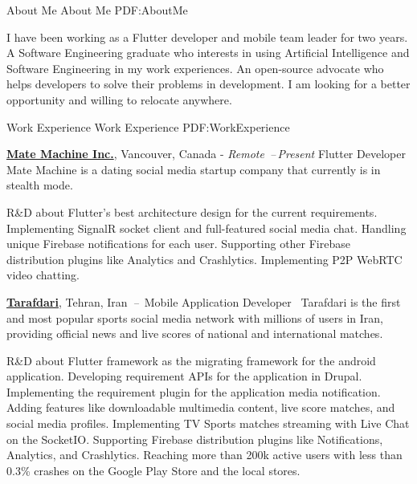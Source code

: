 \documentclass[letterpaper,MMMyyyy,nonstopmode]{resume}
\begin{document}
\begin{Body}



\Section
{About Me}
{About Me}
{PDF:AboutMe}

I have been working as a Flutter developer and mobile team leader for two years.
A Software Engineering graduate who interests in using Artificial Intelligence and Software Engineering in my work experiences.
An open-source advocate who helps developers to solve their problems in development.
I am looking for a better opportunity and willing to relocate anywhere.


\Section
{Work\newline
Experience}
{Work Experience}
{PDF:WorkExperience}

\Entry
\href{https://matemachine.com}
{\textbf{Mate Machine Inc.}},
{\small{Vancouver, Canada - \textit{Remote}}}
\hfill
\textsl{\small{}\,--\,Present}
\Gap
Flutter Developer
\BulletItem
Mate Machine is a dating social media startup company that currently is in stealth mode.
\begin{Detail}
\SubBulletItem
R\&D about Flutter's best architecture design for the current requirements.
\SubBulletItem
Implementing SignalR socket client and full-featured social media chat.
\SubBulletItem
Handling unique Firebase notifications for each user.
\SubBulletItem
Supporting other Firebase distribution plugins like Analytics and Crashlytics.
\SubBulletItem
Implementing P2P WebRTC video chatting.
\end{Detail}

\BigGap
\Entry
\href{https://tarafdari.com}
{\textbf{Tarafdari}},
{\small{Tehran, Iran}}
\hfill
\textsl{\small{\,--\,}}
\Gap
Mobile Application Developer
\normalsize{
\SubBulletSymbol\,
\href{https://play.google.com/store/apps/details?id=com.tarafdari.news}
{\faGooglePlay}}
\BulletItem
Tarafdari is the first and most popular sports social media network with millions of users in Iran, providing official news and live scores
of national and international matches.
\begin{Detail}
\SubBulletItem
R\&D about Flutter framework as the migrating framework for the android application.
\SubBulletItem
Developing requirement APIs for the application in Drupal.
\SubBulletItem
Implementing the requirement plugin for the application media notification.
\SubBulletItem
Adding features like downloadable multimedia content, live score matches, and social media profiles.
\SubBulletItem
Implementing TV Sports matches streaming with Live Chat on the SocketIO.
\SubBulletItem
Supporting Firebase distribution plugins like Notifications, Analytics, and Crashlytics.
\SubBulletItem
Reaching more than 200k active users with less than 0.3\% crashes on the Google Play Store and the local stores.
\end{Detail}


\end{Body}
\end{document}
